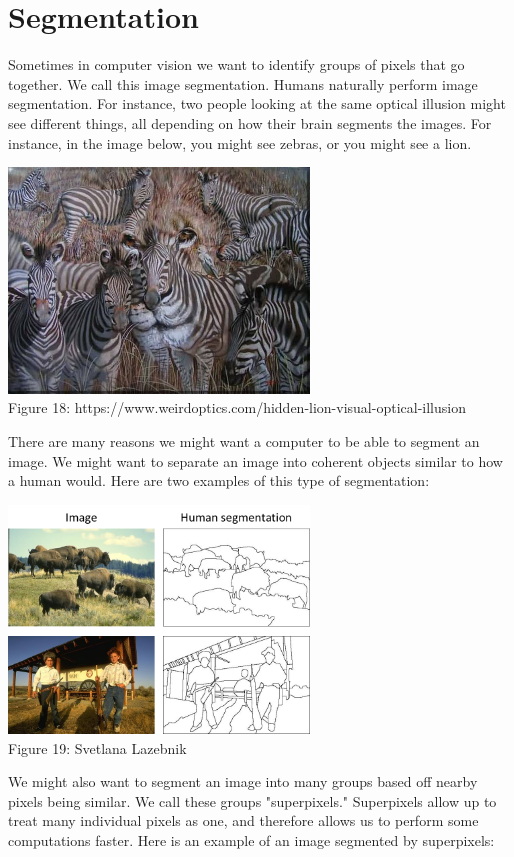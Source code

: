 \documentclass{article}
\begin{document}
\section{Segmentation}
Sometimes in computer vision we want to identify groups of pixels that go together. We call this image segmentation. Humans naturally perform image segmentation. For instance, two people looking at the same optical illusion might see different things, all depending on how their brain segments the images. For instance, in the image below, you might see zebras, or you might see a lion. 
\begin{center}
\includegraphics[width=8cm]{lion.jpg} \\
Figure 18: https://www.weirdoptics.com/hidden-lion-visual-optical-illusion
\end{center}

There are many reasons we might want a computer to be able to segment  an image. We might want to separate an image into coherent objects similar to how a human would. Here are two examples of this type of segmentation:

\begin{center}
\includegraphics[width=8cm]{objects.png} \\
Figure 19:  Svetlana Lazebnik
\end{center}

We might also want to segment an image into many groups based off nearby pixels being similar. We call these groups "superpixels." Superpixels allow up to treat many individual pixels as one, and therefore allows us to perform some computations faster. Here is an example of an image segmented by superpixels:
\end{document}
